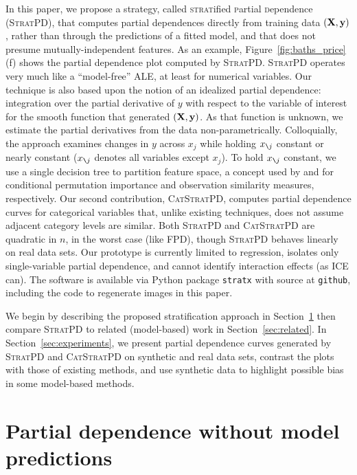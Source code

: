 \documentclass[]{article} %
\newcommand{\secref}[1]{Section~\ref{#1}}
\newcommand{\figref}[1]{Figure~\ref{#1}}
\newcommand{\spd}{\fontfamily{cmr}\textsc{\small StratPD}}
\newcommand{\cspd}{\fontfamily{cmr}\textsc{\small CatStratPD}}
\newcommand{\xnj}{$x_{\texttt{\char`\\} j}$}
\begin{document}
In this paper, we propose a strategy, called {\textsc{strat}ified \textsc{p}artial \textsc{d}ependence} (\spd{}), that computes partial dependences directly from training data $({\bf X}, {\bf y})$, rather than through the predictions of a fitted model, and that does not presume mutually-independent features. As an example, \figref{fig:baths_price}(f) shows the partial dependence plot computed by \spd.  \spd{} operates very much like a ``model-free'' ALE, at least for numerical variables.  Our technique is also based upon the notion of an idealized partial dependence:  integration over the partial derivative of $y$ with respect to the variable of interest for the smooth function that generated $({\bf X}, {\bf y})$. As that function is unknown, we estimate the partial derivatives from the data non-parametrically.  Colloquially, the approach examines changes in $y$ across $x_j$ while holding \xnj{} constant or nearly constant (\xnj{} denotes all variables except $x_j$).  To hold \xnj{} constant, we use a single decision tree to partition feature space, a concept used by \citep{rfimp} and \citep{RFunsup} for conditional permutation importance and observation similarity measures, respectively.  Our second contribution, \cspd{}, computes partial dependence curves for categorical variables that, unlike existing techniques, does not assume adjacent category levels are similar. Both \spd{} and \cspd{} are quadratic in $n$, in the worst case (like FPD), though \spd{} behaves linearly on real data sets.  Our prototype is currently limited to regression, isolates only single-variable partial dependence, and cannot identify interaction effects (as ICE can).  The software is available via Python package {\tt stratx} with source at {\tt github}, including the code to regenerate images in this paper.

We begin by describing the proposed stratification approach in \secref{sec:stratpd} then compare \spd{} to related (model-based) work in \secref{sec:related}. In \secref{sec:experiments}, we present partial dependence curves generated by \spd{} and \cspd{} on synthetic and real data sets, contrast the plots with those of existing methods, and use synthetic data to highlight possible bias in some model-based methods.

\section{Partial dependence without model predictions}\label{sec:stratpd}
\end{document}
